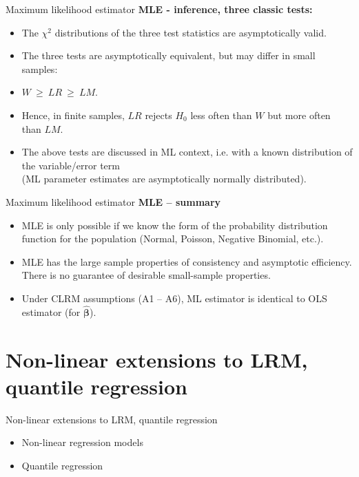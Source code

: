 \documentclass{beamer}
\begin{document}
\begin{frame}{Maximum likelihood estimator}
\textbf{MLE - inference, three classic tests:}\\ \bigskip
\begin{itemize}
    \item The $\chi^2$ distributions of the three test statistics are asymptotically valid.
    \medskip
    \item The three tests are asymptotically equivalent, but may differ in small samples:
    \medskip
    \item $W ~\geq~ \textit{LR}~\geq~ \textit{LM}$.
    \medskip
    \item Hence, in finite samples, $\textit{LR}$ rejects $H_0$ less often than $W$ but more often than $\textit{LM}$.
    \medskip
    \item The above tests are discussed in ML context, i.e. with a known distribution of the variable/error term \\(ML parameter estimates are asymptotically normally distributed).
    
\end{itemize}
\end{frame}
\begin{frame}{Maximum likelihood estimator}
\textbf{MLE -- summary}\\ \medskip
\begin{itemize}
\item MLE is only possible if we know the form of the probability distribution function for the population (Normal, Poisson, Negative Binomial, etc.).
\medskip
\item MLE has the large sample properties of consistency and asymptotic efficiency. There is no guarantee of desirable small-sample properties. 
\medskip
\item Under CLRM assumptions (A1 -- A6), ML estimator is identical to OLS estimator (for $\hat{\bm{\beta}}$).
\end{itemize}
\end{frame}
\section{Non-linear extensions to LRM, quantile regression}
\begin{frame}{Non-linear extensions to LRM, quantile regression}
    \bigskip
    \begin{itemize}
        \item Non-linear regression models
        \bigskip
        \item Quantile regression
        
    \end{itemize}
\end{frame}
\end{document}
